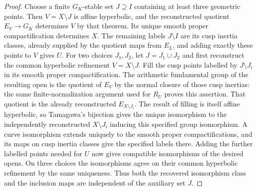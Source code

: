 \begin{proof}
Choose a finite $G_K$-stable set $J\supseteq I$ containing at least three
geometric points. Then $V=X\setminus J$ is affine hyperbolic, and the
reconstructed quotient $E_V\to G_K$ determines $V$ by that theorem.
Its unique smooth proper compactification determines $X$. The remaining
labels $J\setminus I$ are its cusp inertia classes, already supplied by
the quotient maps from $E_L$, and adding exactly these points to $V$
gives $U$. For two choices $J_1,J_2$, let $J=J_1\cup J_2$ and first
reconstruct the common hyperbolic refinement $V=X\setminus J$.
Fill the cusp points labelled by $J\setminus J_i$ in its smooth proper
compactification. The arithmetic fundamental group of the resulting
open is the quotient of $E_V$ by the normal closure of those cusp
inertias: the same finite-normalization argument used for $R_U$ proves
this assertion. That quotient is the already reconstructed
$E_{X\setminus J_i}$. The result of filling is itself affine
hyperbolic, so Tamagawa's bijection gives the unique isomorphism to
the independently reconstructed $X\setminus J_i$ inducing this
specified group isomorphism. A curve isomorphism extends uniquely to
the smooth proper compactifications, and its maps on cusp inertia
classes give the specified labels there. Adding the further labelled
points needed for $U$ now gives compatible isomorphisms of the desired
opens. On three choices the isomorphisms agree on their common
hyperbolic refinement by the same uniqueness. Thus both the recovered
isomorphism class and the inclusion maps are independent of the
auxiliary set $J$.
\end{proof}
